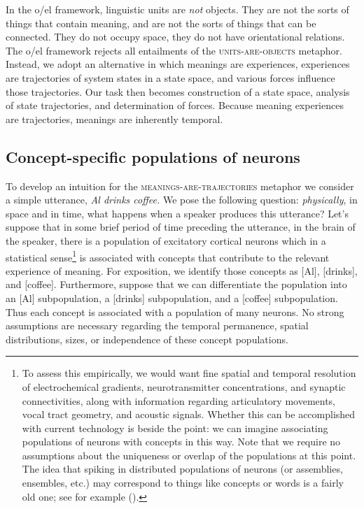   In the o/el framework, linguistic units are \textit{not} objects. They are not the sorts of things that contain meaning, and are not the sorts of things that can be connected. They do not occupy space, they do not have orientational relations. The o/el framework rejects all entailments of the \textsc{units}\textsc{{}-are-}\textsc{objects} metaphor. Instead, we adopt an alternative in which meanings are experiences, experiences are trajectories of system states in a state space, and various forces influence those trajectories. Our task then becomes construction of a state space, analysis of state trajectories, and determination of forces. Because meaning experiences are trajectories, meanings are inherently temporal. 

\subsection{Concept-specific populations of neurons}

To develop an intuition for the \textsc{meanings}\textsc{{}-are-}\textsc{trajectories} metaphor we consider a simple utterance, \textit{Al drinks coffee.} We pose the following question: \textit{physically}, in space and in time, what happens when a speaker produces this utterance? Let's suppose that in some brief period of time preceding the utterance, in the brain of the speaker, there is a population of excitatory cortical neurons which in a statistical sense\footnote{To assess this empirically, we would want fine spatial and temporal resolution of electrochemical gradients, neurotransmitter concentrations, and synaptic connectivities, along with information regarding articulatory movements, vocal tract geometry, and acoustic signals. Whether this can be accomplished with current technology is beside the point: we can imagine associating populations of neurons with concepts in this way. Note that we require no assumptions about the uniqueness or overlap of the populations at this point. The idea that spiking in distributed populations of neurons (or assemblies, ensembles, etc.) may correspond to things like concepts or words is a fairly old one; see for example (\citealt{Abeles2012,Braitenberg1978,Hebb1949,pulvermuller1999}).} is associated with concepts that contribute to the relevant experience of meaning. For exposition, we identify those concepts as [Al], [drinks], and [coffee]. Furthermore, suppose that we can differentiate the population into an [Al] subpopulation, a [drinks] subpopulation, and a [coffee] subpopulation. Thus each concept is associated with a population of many neurons. No strong assumptions are necessary regarding the temporal permanence, spatial distributions, sizes, or independence of these concept populations.


